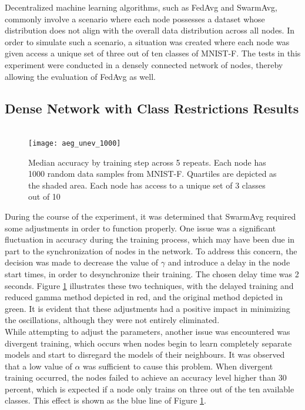 Decentralized machine learning algorithms, such as FedAvg and SwarmAvg, commonly involve a scenario where each node possesses a dataset whose distribution does not align with the overall data distribution across all nodes. In order to simulate such a scenario, a situation was created where each node was given access a unique set of three out of ten classes of MNIST-F. The tests in this experiment were conducted in a densely connected network of nodes, thereby allowing the evaluation of FedAvg as well.

\subsection{Dense Network with Class Restrictions Results}

\begin{figure}[H] 
	 \\
	\texttt{[image: aeg\_unev\_1000]}
	\caption{Median accuracy by training step across 5 repeats. Each node has 1000 random data samples from MNIST-F. Quartiles are depicted as the shaded area. Each node has access to a unique set of 3 classes out of 10}
	\label{aeg7}
\end{figure}

During the course of the experiment, it was determined that SwarmAvg required some adjustments in order to function properly. One issue was a significant fluctuation in accuracy during the training process, which may have been due in part to the synchronization of nodes in the network. To address this concern, the decision was made to decrease the value of $\gamma$ and introduce a delay in the node start times, in order to desynchronize their training. The chosen delay time was 2 seconds. Figure \ref{aeg7} illustrates these two techniques, with the delayed training and reduced gamma method depicted in red, and the original method depicted in green. It is evident that these adjustments had a positive impact in minimizing the oscillations, although they were not entirely eliminated. \\

While attempting to adjust the parameters, another issue was encountered was divergent training, which occurs when nodes begin to learn completely separate models and start to disregard the models of their neighbours. It was observed that a low value of $\alpha$ was sufficient to cause this problem. When divergent training occurred, the nodes failed to achieve an accuracy level higher than 30 percent, which is expected if a node only trains on three out of the ten available classes. This effect is shown as the blue line of Figure \ref{aeg7}. \\

